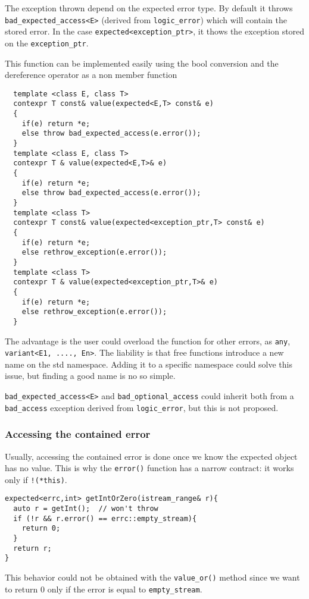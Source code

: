 \documentclass[a4paper,10pt]{article}
\newcommand{\cpp}[1]{\lstinline{#1}}
\begin{document}
The exception thrown depend on the expected error type. By default it throws \cpp{bad_expected_access<E>} (derived from \cpp{logic_error}) which will contain the stored error. In the case \cpp{expected<exception_ptr>}, it thows the exception stored on the \cpp{exception_ptr}.

This function can be implemented easily using the bool conversion and the dereference operator as a non member function

\begin{lstlisting}
  template <class E, class T>
  contexpr T const& value(expected<E,T> const& e)
  {
    if(e) return *e;
    else throw bad_expected_access(e.error());
  }
  template <class E, class T>
  contexpr T & value(expected<E,T>& e)
  {
    if(e) return *e;
    else throw bad_expected_access(e.error());
  }
  template <class T>
  contexpr T const& value(expected<exception_ptr,T> const& e)
  {
    if(e) return *e;
    else rethrow_exception(e.error());
  }
  template <class T>
  contexpr T & value(expected<exception_ptr,T>& e)
  {
    if(e) return *e;
    else rethrow_exception(e.error());
  }
\end{lstlisting}

The advantage is the user could overload the function for other errors, as \cpp{any}, \cpp{variant<E1, ...., En>}. The liability is that free functions introduce a new name on the std namespace. Adding it to a specific namespace could solve this issue, but finding a good name is no so simple.

\cpp{bad_expected_access<E>} and \cpp{bad_optional_access} could inherit both from a \cpp{bad_access} exception derived from \cpp{logic_error}, but this is not proposed.

\subsubsection{Accessing the contained error}

Usually, accessing the contained error is done once we know the expected object has no value. This is why the \cpp{error()} function has a narrow contract: it works only if \cpp{!(*this)}.

\begin{lstlisting}
expected<errc,int> getIntOrZero(istream_range& r){
  auto r = getInt();  // won't throw
  if (!r && r.error() == errc::empty_stream){
    return 0;
  }
  return r;
}
\end{lstlisting}

\noindent
This behavior could not be obtained with the \cpp{value_or()} method since we want to return 0 only if the error is equal to \cpp{empty_stream}.
\end{document}

